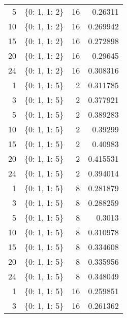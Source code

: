 \documentclass{article}
\begin{document}
\begin{table}[H]
\begin{tabular}{rlrr}
              5 & \{0: 1, 1: 2\}              &          16 &               0.26311   \\
             10 & \{0: 1, 1: 2\}              &          16 &               0.269942  \\
             15 & \{0: 1, 1: 2\}              &          16 &               0.272898  \\
             20 & \{0: 1, 1: 2\}              &          16 &               0.29645   \\
             24 & \{0: 1, 1: 2\}              &          16 &               0.308316  \\
              1 & \{0: 1, 1: 5\}              &           2 &               0.311785  \\
              3 & \{0: 1, 1: 5\}              &           2 &               0.377921  \\
              5 & \{0: 1, 1: 5\}              &           2 &               0.389283  \\
             10 & \{0: 1, 1: 5\}              &           2 &               0.39299   \\
             15 & \{0: 1, 1: 5\}              &           2 &               0.40983   \\
             20 & \{0: 1, 1: 5\}              &           2 &               0.415531  \\
             24 & \{0: 1, 1: 5\}              &           2 &               0.394014  \\
              1 & \{0: 1, 1: 5\}              &           8 &               0.281879  \\
              3 & \{0: 1, 1: 5\}              &           8 &               0.288259  \\
              5 & \{0: 1, 1: 5\}              &           8 &               0.3013    \\
             10 & \{0: 1, 1: 5\}              &           8 &               0.310978  \\
             15 & \{0: 1, 1: 5\}              &           8 &               0.334608  \\
             20 & \{0: 1, 1: 5\}              &           8 &               0.335956  \\
             24 & \{0: 1, 1: 5\}              &           8 &               0.348049  \\
              1 & \{0: 1, 1: 5\}              &          16 &               0.259851  \\
              3 & \{0: 1, 1: 5\}              &          16 &               0.261362  \\

\end{tabular}
\end{table}
\end{document}

